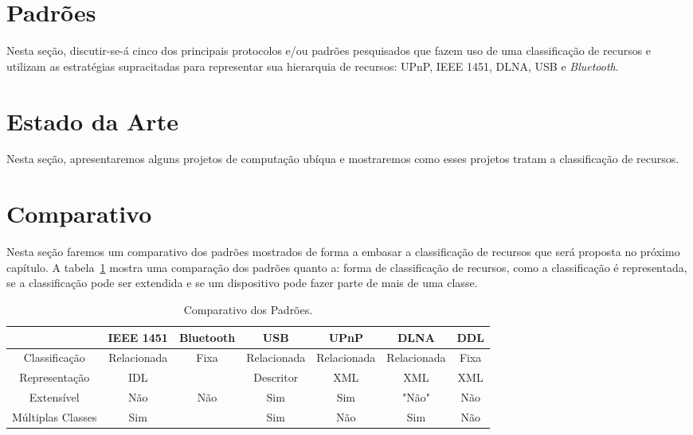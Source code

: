 \section{Padrões}

Nesta seção, discutir-se-á cinco dos principais protocolos e/ou padrões pesquisados que fazem uso de uma classificação de recursos e utilizam as estratégias supracitadas para representar sua hierarquia de recursos: UPnP, IEEE 1451, DLNA, USB e \emph{Bluetooth}.








\section{Estado da Arte}
Nesta seção, apresentaremos alguns projetos de computação ubíqua e mostraremos como esses projetos tratam a classificação de recursos.





\section{Comparativo}
Nesta seção faremos um comparativo dos padrões mostrados de forma a embasar a classificação de recursos que será proposta no próximo capítulo. A tabela~\ref{tab:comparativo} mostra uma comparação dos padrões quanto a: forma de classificação de recursos, como a classificação é representada, se a classificação pode ser extendida e se um dispositivo pode fazer parte de mais de uma classe.

\begin{table}
	\begin{center}
	\resizebox{16cm}{!} {
		\begin{tabular}{ccccccc}
		\hline
							& \textbf{IEEE 1451}	& \textbf{Bluetooth} 	& \textbf{USB}	& \textbf{UPnP} & \textbf{DLNA} & \textbf{DDL}\\
		\hline
		\hline
		Classificação 		& Relacionada 			& Fixa 					& Relacionada 	& Relacionada 	& Relacionada 	& Fixa \\
		\hline
		Representação 		& IDL 					&						& Descritor		& XML			& XML 			& XML \\ 
		\hline
		Extensível 			& Não 					& Não 					& Sim 			& Sim 			& "Não" 		& Não \\
		\hline
		Múltiplas Classes 	& Sim 					&						& Sim 			& Não 			& Sim 			& Não \\
		\hline
		\end{tabular}
	}
	\end{center}
	\caption{Comparativo dos Padrões.}
	\label{tab:comparativo}
\end{table}
 
